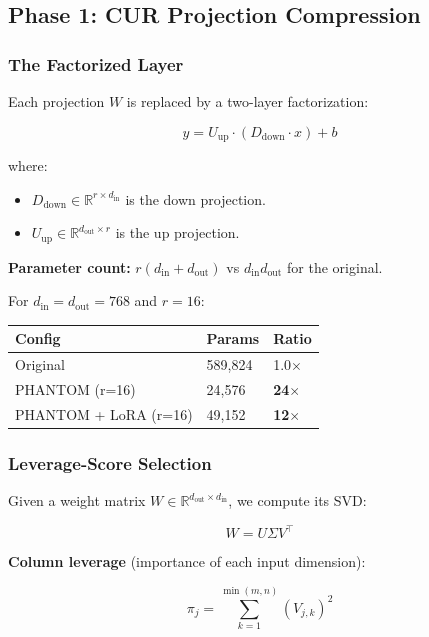 \subsection{Phase 1: CUR Projection Compression}

\subsubsection{The Factorized Layer}

Each projection $W$ is replaced by a two-layer factorization:

\[
y = U_\text{up} \cdot (D_\text{down} \cdot x) + b
\tag{4.1}
\]

where:
\begin{itemize}
\item $D_\text{down} \in \mathbb{R}^{r \times d_\text{in}}$ is the down projection.
\item $U_\text{up} \in \mathbb{R}^{d_\text{out} \times r}$ is the up projection.

\end{itemize}
\textbf{Parameter count:} $r(d_\text{in} + d_\text{out})$ vs $d_\text{in} d_\text{out}$ 
for the original.

For $d_\text{in} = d_\text{out} = 768$ and $r = 16$:

\begin{table}[H]
\centering
\small
\begin{tabular}{lll}
\toprule
\textbf{Config} & \textbf{Params} & \textbf{Ratio} \\
\midrule
Original & 589,824 & 1.0$\times$ \\
PHANTOM (r=16) & 24,576 & \textbf{24$\times$} \\
PHANTOM + LoRA (r=16) & 49,152 & \textbf{12$\times$} \\
\bottomrule
\end{tabular}
\end{table}

\subsubsection{Leverage-Score Selection}

Given a weight matrix $W \in \mathbb{R}^{d_\text{out} \times d_\text{in}}$, 
we compute its SVD:

\[
W = U \Sigma V^\top
\tag{4.2}
\]

\textbf{Column leverage} (importance of each input dimension):

\[
\pi_j = \sum_{k=1}^{\min(m, n)} (V_{j, k})^2
\tag{4.3}
\]


